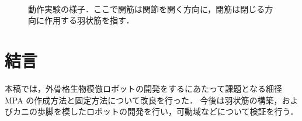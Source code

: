 \documentclass{jarticle}
\begin{document}
\begin{figure}[t]
  \centering
  \\%
  \vspace{-2mm}
  \vspace{-2mm}
  \vspace{-2mm}
  \caption{動作実験の様子．ここで開筋は関節を開く方向に，閉筋は閉じる方向に作用する羽状筋を指す．}
  \label{fig:move}
  \vspace{-2mm}
\end{figure}
\vspace*{-2mm}
\section{結言}

本稿では，外骨格生物模倣ロボットの開発をするにあたって課題となる細径MPA の作成方法と固定方法について改良を行った．
今後は羽状筋の構築，およびカニの歩脚を模したロボットの開発を行い，可動域などについて検証を行う．
\end{document}
